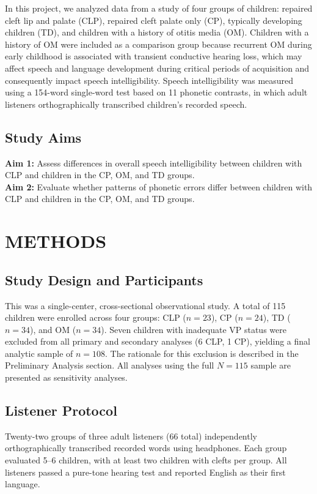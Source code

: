 \documentclass[11pt]{article}
\begin{document}
In this project, we analyzed data from a study of four groups of children:
repaired cleft lip and palate (CLP), repaired cleft palate only (CP),
typically developing children (TD), and children with a history of otitis
media (OM). Children with a history of OM were included as a comparison group
because recurrent OM during early childhood is associated with transient
conductive hearing loss, which may affect speech and language development
during critical periods of acquisition and consequently impact speech
intelligibility. Speech intelligibility was measured using a 154-word
single-word test based on 11 phonetic contrasts, in which adult listeners
orthographically transcribed children's recorded speech.

\subsection*{Study Aims}
\textbf{Aim 1:} Assess differences in overall speech intelligibility between
children with CLP and children in the CP, OM, and TD groups.\\[0.5em]
\textbf{Aim 2:} Evaluate whether patterns of phonetic errors differ between
children with CLP and children in the CP, OM, and TD groups.

\section*{METHODS}\label{sec:methods}
\subsection*{Study Design and Participants}\label{sec:design}
This was a single-center, cross-sectional observational study. A total of 115
children were enrolled across four groups: CLP ($n=23$), CP ($n=24$), TD
($n=34$), and OM ($n=34$). Seven children with inadequate VP status were
excluded from all primary and secondary analyses (6 CLP, 1 CP), yielding a
final analytic sample of $n=108$. The rationale for this exclusion is
described in the Preliminary Analysis section. All analyses using the full
$N=115$ sample are presented as sensitivity analyses.

\subsection*{Listener Protocol}\label{sec:listeners}
Twenty-two groups of three adult listeners (66 total) independently
orthographically transcribed recorded words using headphones. Each group
evaluated 5--6 children, with at least two children with clefts per group.
All listeners passed a pure-tone hearing test and reported English as their
first language.
\end{document}

